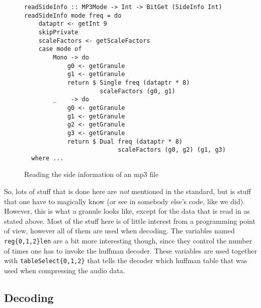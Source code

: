 \documentclass[a4paper,12pt]{article}
\begin{document}
\begin{figure}[H]
  \begin{center}
    \begin{lstlisting}
readSideInfo :: MP3Mode -> Int -> BitGet (SideInfo Int)
readSideInfo mode freq = do
    dataptr <- getInt 9
    skipPrivate
    scaleFactors <- getScaleFactors
    case mode of
        Mono -> do
            g0 <- getGranule
            g1 <- getGranule
            return $ Single freq (dataptr * 8)
                     scaleFactors (g0, g1)
        _    -> do
            g0 <- getGranule
            g1 <- getGranule
            g2 <- getGranule
            g3 <- getGranule
            return $ Dual freq (dataptr * 8)
                          scaleFactors (g0, g2) (g1, g3)
  where ...
    \end{lstlisting}
    \caption{Reading the side information of an mp3 file}\label{fig:sideinfo}
  \end{center}
\end{figure}

    So, lots of stuff that is done here are \textit{not} mentioned in the
    standard, but is stuff that one have to magically know (or see in somebody
    else's code, like we did). However, this is what a granule looks like,
    except for the data that is read in as stated above. Most of the stuff here
    is of little interest from a programming point of view, however all of them
    are used when decoding. The variables named \texttt{reg\{0,1,2\}len} are a
    bit more interesting though, since they control the number of times one has
    to invoke the huffman decoder. These variables are used together with
    \texttt{tableSelect\{0,1,2\}} that tells the decoder which huffman table
    that was used when compressing the audio data.

    \subsection{Decoding}
\end{document}
